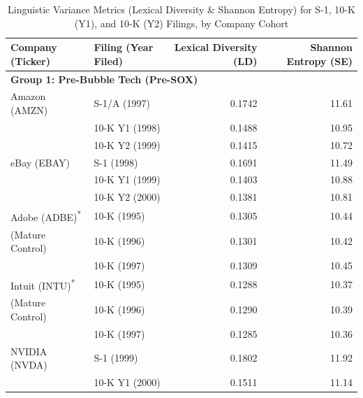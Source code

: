 \documentclass[12pt, letterpaper]{article}
\begin{document}
\begin{table}
    \centering
    \footnotesize
    \caption{Linguistic Variance Metrics (Lexical Diversity \& Shannon Entropy) for S-1, 10-K (Y1), and 10-K (Y2) Filings, by Company Cohort}
    \label{tab:variance-metrics}
    \begin{tabular}{@{}llrr@{}}
        \toprule
        \textbf{Company (Ticker)} & \textbf{Filing (Year Filed)} & \textbf{Lexical Diversity (LD)} & \textbf{Shannon Entropy (SE)} \\
        \midrule
        \multicolumn{4}{l}{\textbf{Group 1: Pre-Bubble Tech (Pre-SOX)}} \\
        \addlinespace
        Amazon (AMZN)       & S-1/A (1997)                 & 0.1742 & 11.61 \\
                            & 10-K Y1 (1998)               & 0.1488 & 10.95 \\
                            & 10-K Y2 (1999)               & 0.1415 & 10.72 \\
        \addlinespace
        eBay (EBAY)         & S-1 (1998)                   & 0.1691 & 11.49 \\
                            & 10-K Y1 (1999)               & 0.1403 & 10.88 \\
                            & 10-K Y2 (2000)               & 0.1381 & 10.81 \\
        \addlinespace
        Adobe (ADBE)\textsuperscript{*}    & 10-K (1995)                  & 0.1305 & 10.44 \\
        (Mature Control)    & 10-K (1996)                  & 0.1301 & 10.42 \\
                            & 10-K (1997)                  & 0.1309 & 10.45 \\
        \addlinespace
        Intuit (INTU)\textsuperscript{*}   & 10-K (1995)                  & 0.1288 & 10.37 \\
        (Mature Control)    & 10-K (1996)                  & 0.1290 & 10.39 \\
                            & 10-K (1997)                  & 0.1285 & 10.36 \\
        \addlinespace
        NVIDIA (NVDA)       & S-1 (1999)                   & 0.1802 & 11.92 \\
                            & 10-K Y1 (2000)               & 0.1511 & 11.14 \\

\end{tabular}
\end{table}
\end{document}
